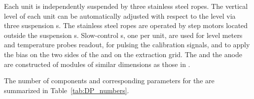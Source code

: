Each  unit is independently suspended by three stainless steel ropes. The vertical level of each  unit can be automatically adjusted with respect to the \lar level via three suspension \fdth{}s. The stainless steel ropes are operated by step motors located outside the suspension \fdth{}s. Slow-control \fdth{}s,  one per  unit, are used for level meters and temperature probes readout,
  for pulsing the calibration signals, and to apply the  bias on the two sides of the  and on the extraction grid. The  and the anode are constructed of modules of similar dimensions as those in .

The number of components and corresponding parameters for the \dpactivelarmass {} are summarized in Table~\ref{tab:DP_numbers}.

